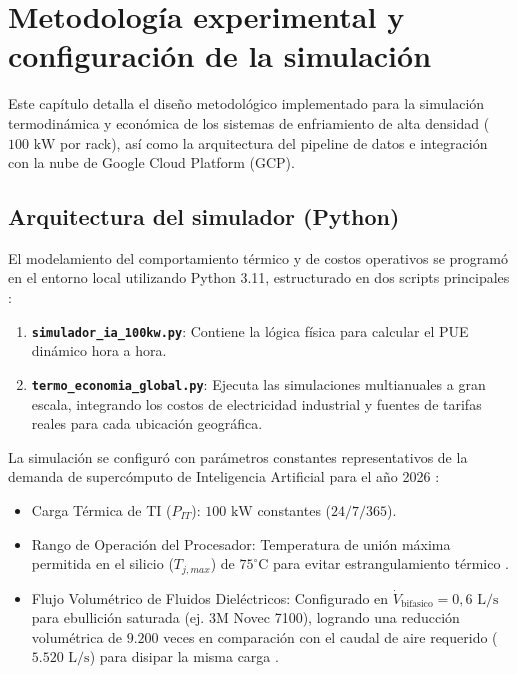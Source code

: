 \shorthandoff{<}\shorthandoff{>}
\chapter{Metodolog\'ia experimental y configuraci\'on de la simulaci\'on}
\label{chap:metodologia}

Este cap\'itulo detalla el dise\~no metodol\'ogico implementado para la simulaci\'on termodin\'amica y econ\'omica de los sistemas de enfriamiento de alta densidad ($100\text{ kW}$ por rack), as\'i como la arquitectura del pipeline de datos e integraci\'on con la nube de Google Cloud Platform (GCP).

\section{Arquitectura del simulador (Python)}\label{sec:arquitectura_simulador}
El modelamiento del comportamiento t\'ermico y de costos operativos se program\'o en el entorno local utilizando Python 3.11, estructurado en dos scripts principales \cite{incropera2007}:
\begin{enumerate}
    \item \textbf{\texttt{simulador\_ia\_100kw.py}}: Contiene la l\'ogica f\'isica para calcular el PUE din\'amico hora a hora.
    \item \textbf{\texttt{termo\_economia\_global.py}}: Ejecuta las simulaciones multianuales a gran escala, integrando los costos de electricidad industrial y fuentes de tarifas reales para cada ubicaci\'on geogr\'afica.
\end{enumerate}

La simulaci\'on se configur\'o con par\'ametros constantes representativos de la demanda de superc\'omputo de Inteligencia Artificial para el a\~no 2026 \cite{ashrae2021}:
\begin{itemize}
    \item Carga T\'ermica de TI ($P_{IT}$): $100\text{ kW}$ constantes ($24/7/365$).
    \item Rango de Operaci\'on del Procesador: Temperatura de uni\'on m\'axima permitida en el silicio ($T_{j,max}$) de $75^\circ\text{C}$ para evitar estrangulamiento t\'ermico \cite{ashrae2021}.
    \item Flujo Volum\'etrico de Fluidos Diel\'ectricos: Configurado en $\dot{V}_{\text{bifasico}} = 0,6\text{ L/s}$ para ebullici\'on saturada (ej. 3M Novec 7100), logrando una reducci\'on volum\'etrica de $9.200$ veces en comparaci\'on con el caudal de aire requerido ($5.520\text{ L/s}$) para disipar la misma carga \cite{garrity2014}.
\end{itemize}

